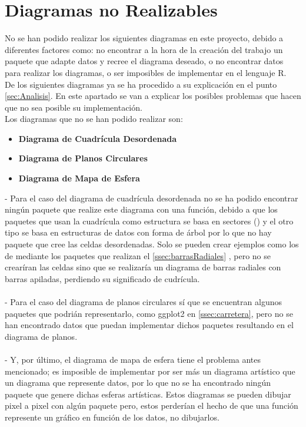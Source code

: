 \documentclass{article}\usepackage[]{graphicx}\usepackage[]{color}
\begin{document}
\section{Diagramas no Realizables}
No se han podido realizar los siguientes diagramas en este proyecto, debido a diferentes factores como: no encontrar a la hora de la creaci\'on del trabajo un paquete que adapte datos y recree el diagrama deseado, o no encontrar datos para realizar los diagramas, o ser imposibles de implementar en el lenguaje R.~\\
De los siguientes diagramas ya se ha procedido a su explicaci\'on en el punto  \ref{sec:Analisis}. En este apartado se van a explicar los posibles problemas que hacen que no sea posible su implementaci\'on.~\\
Los diagramas que no se han podido realizar son:
\begin{itemize}
\item \textbf{Diagrama de Cuadr\'icula Desordenada}
\item \textbf{Diagrama de Planos Circulares}
\item \textbf{Diagrama de Mapa de Esfera}
\end{itemize}
 - Para el caso del diagrama de cuadr\'icula desordenada no se ha podido encontrar ning\'un paquete que realize este diagrama con una funci\'on, debido a que los paquetes que usan la cuadr\'icula como estructura se basa en sectores ()
 y el otro tipo se basa en estructuras de datos con forma de \'arbol por lo que no hay paquete que cree las celdas desordenadas. Solo se pueden crear ejemplos como los de %
 mediante los paquetes que realizan el  \ref{ssec:barrasRadiales}
 , pero no se crear\'iran las celdas sino que se realizar\'ia un diagrama de barras radiales con barras apiladas, perdiendo su significado de cudr\'icula.~\\~\\
 - Para el caso del diagrama de planos circulares s\'i que se encuentran algunos paquetes que podri\'an representarlo, como ggplot2 en  \ref{ssec:carretera}, pero no se han encontrado datos que puedan implementar dichos paquetes resultando en el diagrama de planos.~\\~\\
 - Y, por \'ultimo, el diagrama de mapa de esfera tiene el problema antes mencionado; es imposible de implementar por ser m\'as un diagrama art\'istico que un diagrama que represente datos, por lo que no se ha encontrado ning\'un paquete que genere dichas esferas art\'isticas. Estos diagramas se pueden dibujar pixel a pixel con alg\'un paquete pero, estos perder\'ian el hecho de que una funci\'on represente un gr\'afico en funci\'on de los datos, no dibujarlos.~\\~\\~\\
\end{document}
